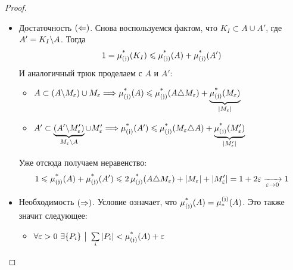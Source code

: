 \begin{proof}~
	\begin{itemize}
		\item Достаточность $(\La)$. Снова воспользуемся фактом, что $K_I \subset A \cup A'$, где $A' = K_I \bs A$. Тогда
		\[
			1 = \upjlm(K_I) \le \upjlm(A) + \upjlm(A')
		\]
		И аналогичный трюк проделаем с $A$ и $A'$:
		\begin{itemize}
			\item \(A \subset (A \bs M_\eps) \cup M_\eps \Longrightarrow \upjlm(A) \le \upjlm(A \tr M_\eps) + \underbrace{\upjlm(M_\eps)}_{|M_\eps|}\)
			
			\item \(A' \subset \underbrace{(A' \bs M'_\eps)}_{M_\eps \bs A} \cup M'_\eps \Longrightarrow \upjlm(A') \le \upjlm(M_\eps \tr A) + \underbrace{\upjlm(M'_\eps)}_{|M'_\eps|}\)
		\end{itemize}
		Уже отсюда получаем неравенство:
		\[
			1 \le \upjlm(A) + \upjlm(A') \le 2\upjlm(A \tr M_\eps) + |M_\eps| + |M'_\eps| = 1 + 2\eps \xrightarrow[\eps \to 0]{} 1
		\]
		
		\item Необходимость $(\Ra)$. Условие означает, что $\upjlm(A) = \downjlm(A)$. Это также значит следующее:
		\begin{itemize}
			\item \(\forall \eps > 0\ \exists \{P_i\} \such \suml_i |P_i| < \upjlm(A) + \eps\)
			

\end{itemize}
\end{itemize}
\end{proof}
